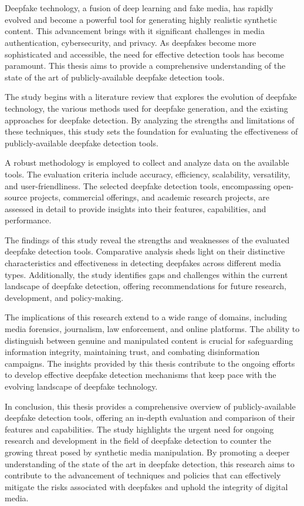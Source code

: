 \chapter{\abstractname}

Deepfake technology, a fusion of deep learning and fake media, has rapidly evolved and become a powerful tool for generating 
highly realistic synthetic content. This advancement brings with it significant challenges in media authentication, 
cybersecurity, and privacy. As deepfakes become more sophisticated and accessible, the need for effective detection tools 
has become paramount. This thesis aims to provide a comprehensive understanding of the state of the art of publicly-available 
deepfake detection tools.

The study begins with a literature review that explores the evolution of deepfake technology, the various methods used for deepfake 
generation, and the existing approaches for deepfake detection. By analyzing the strengths and limitations of these techniques, this 
study sets the foundation for evaluating the effectiveness of publicly-available deepfake detection tools.

A robust methodology is employed to collect and analyze data on the available tools. The evaluation criteria include accuracy, 
efficiency, scalability, versatility, and user-friendliness. The selected deepfake detection tools, encompassing open-source projects, 
commercial offerings, and academic research projects, are assessed in detail to provide insights into their features, capabilities, and performance.

The findings of this study reveal the strengths and weaknesses of the evaluated deepfake detection tools. Comparative analysis sheds 
light on their distinctive characteristics and effectiveness in detecting deepfakes across different media types. Additionally, the study 
identifies gaps and challenges within the current landscape of deepfake detection, offering recommendations for future research, 
development, and policy-making.

The implications of this research extend to a wide range of domains, including media forensics, journalism, law enforcement, and 
online platforms. The ability to distinguish between genuine and manipulated content is crucial for safeguarding information integrity, 
maintaining trust, and combating disinformation campaigns. The insights provided by this thesis contribute to the ongoing efforts to develop 
effective deepfake detection mechanisms that keep pace with the evolving landscape of deepfake technology.

In conclusion, this thesis provides a comprehensive overview of publicly-available deepfake detection tools, offering an in-depth evaluation 
and comparison of their features and capabilities. The study highlights the urgent need for ongoing research and development in the field of 
deepfake detection to counter the growing threat posed by synthetic media manipulation. By promoting a deeper understanding of the state of 
the art in deepfake detection, this research aims to contribute to the advancement of techniques and policies that can effectively mitigate 
the risks associated with deepfakes and uphold the integrity of digital media.
